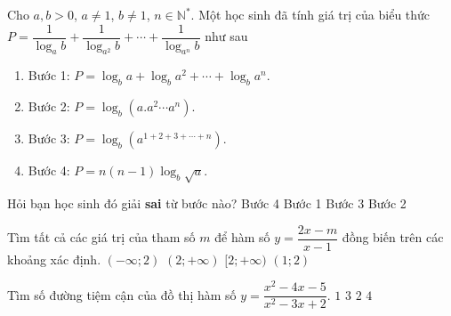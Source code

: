 \begin{ex}%
Cho $a,b>0$, $a\neq 1$, $b\neq 1$, $n\in\mathbb N^{*}$. Một học sinh đã tính giá trị của biểu thức $P=\dfrac{1}{\log_{a}b}+\dfrac{1}{\log_{a^{2}}b}+\cdots+\dfrac{1}{\log_{a^{n}}b}$ như sau
\begin{enumerate}[ ]
\item Bước 1: $P=\log_{b}a+\log_{b}a^{2}+\cdots+\log_{b}a^{n}$.
\item Bước 2: $P=\log_{b}(a.a^{2}\cdots a^{n})$.
\item Bước 3: $P=\log_{b}(a^{1+2+3+\cdots+n})$.
\item Bước 4: $P=n(n-1)\log_{b}\sqrt{a}$.
\end{enumerate}
Hỏi bạn học sinh đó giải \textbf{sai} từ bước nào?
\choice
{\True Bước 4}
{Bước 1}
{Bước 3}
{Bước 2}
\end{ex}
\begin{ex}%
Tìm tất cả các giá trị của tham số $m$ để hàm số $y=\dfrac{2x-m}{x-1}$ đồng biến trên các khoảng xác định.
\choice
{$(-\infty;2)$}
{\True $(2;+\infty)$}
{$[2;+\infty)$}
{$(1;2)$}
\end{ex}
\begin{ex}%
Tìm số đường tiệm cận của đồ thị hàm số $y=\dfrac{x^{2}-4x-5}{x^{2}-3x+2}$.
\choice
{$1$}
{\True $3$}
{$2$}
{$4$}
\end{ex}
